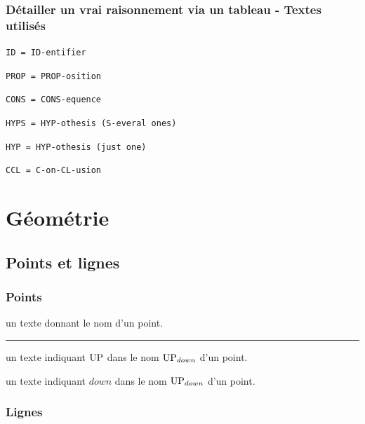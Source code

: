 \documentclass[12pt,a4paper]{book}
\theoremstyle{definition}
\newcommand\separation{
	\medskip
	\hfill\rule{0.5\textwidth}{0.75pt}\hfill
	\medskip
}
\newcommand\extraspace{
	\vspace{0.25em}
}
\newcommand\mwhyprefix[2]{%
	\texttt{#1 = #1-#2}%
}
\newcommand\prefix[1]{%
	\texttt{#1}%
}
\begin{document}
{{\subsubsection{Détailler un \og vrai \fg{} raisonnement via un tableau - Textes utilisés}

     \hfill \mwhyprefix{ID}{entifier}


   \hfill \mwhyprefix{PROP}{osition}

   \hfill \mwhyprefix{CONS}{equence}

\extraspace

   \hfill \prefix{HYPS = HYP-othesis (S-everal ones)} 

    \hfill \prefix{HYP = HYP-othesis (just one)}

    \hfill \prefix{CCL = C-on-CL-usion}

\extraspace



\section{Géométrie}

\subsection{Points et lignes}

\subsubsection{Points}




\IDarg{} un texte donnant le nom d'un point.


\separation



 un texte indiquant $\pt{UP}$ dans le nom $\pt*{UP}{down}$ d'un point.

 un texte indiquant $down$ dans le nom $\pt*{UP}{down}$ d'un point.




\subsubsection{Lignes}



}}
\end{document}
